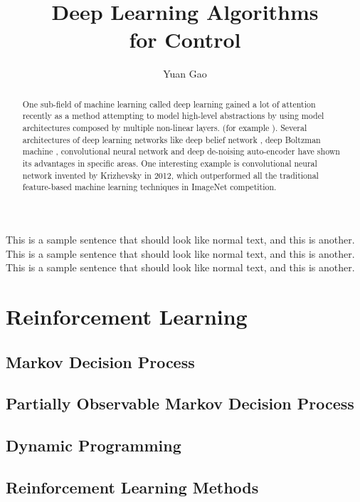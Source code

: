 \documentclass[officiallayout]{tktla}
\title{Deep Learning Algorithms \\ for Control}
\author{Yuan Gao}
\begin{document}
\frontmatter

\maketitle

\begin{abstract}
One sub-field of machine learning called deep learning gained a lot of attention recently as a method attempting to model high-level abstractions by using model architectures composed by multiple non-linear layers. (for example \cite{Krizhevsky2012}). Several architectures of deep learning networks like deep belief network \cite{Hinton2006}, deep Boltzman machine \cite{Salakhutdinov2009}, convolutional neural network \cite{Krizhevsky2012} and deep de-noising auto-encoder \cite{Vincent2010} have shown its advantages in specific areas. One interesting example is convolutional neural network invented by Krizhevsky in 2012, which  outperformed all the traditional feature-based machine learning techniques in ImageNet competition.
\end{abstract}

\begin{acknowledgements}
  This is a sample sentence that should look like normal text, and
  this is another. This is a sample sentence that should look like
  normal text, and this is another. This is a sample sentence that
  should look like normal text, and this is another.
\end{acknowledgements}

\tableofcontents

\mainmatter

\chapter{Reinforcement Learning}
\section{Markov Decision Process}
\section{Partially Observable Markov Decision Process}
\section{Dynamic Programming}
\section{Reinforcement Learning Methods}
\end{document}
